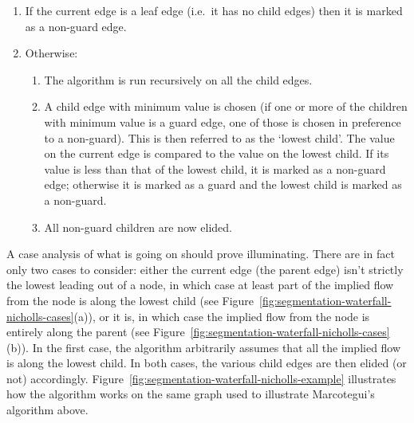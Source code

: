 \begin{enumerate}

\item If the current edge is a leaf edge (i.e.~it has no child edges) then it is marked as a non-guard edge.

\item Otherwise:

\begin{enumerate}

\item The algorithm is run recursively on all the child edges.

\item A child edge with minimum value is chosen (if one or more of the children with minimum value is a guard edge, one of those is chosen in preference to a non-guard). This is then referred to as the `lowest child'. The value on the current edge is compared to the value on the lowest child. If its value is less than that of the lowest child, it is marked as a non-guard edge; otherwise it is marked as a guard and the lowest child is marked as a non-guard.

\item All non-guard children are now elided.

\end{enumerate}

\end{enumerate}

A case analysis of what is going on should prove illuminating. There are in fact only two cases to consider: either the current edge (the parent edge) isn't strictly the lowest leading out of a node, in which case at least part of the implied flow from the node is along the lowest child (see Figure~\ref{fig:segmentation-waterfall-nicholls-cases}(a)), or it is, in which case the implied flow from the node is entirely along the parent (see Figure~\ref{fig:segmentation-waterfall-nicholls-cases}(b)). In the first case, the algorithm arbitrarily assumes that all the implied flow is along the lowest child. In both cases, the various child edges are then elided (or not) accordingly. Figure~\ref{fig:segmentation-waterfall-nicholls-example} illustrates how the algorithm works on the same graph used to illustrate Marcotegui's algorithm above.

